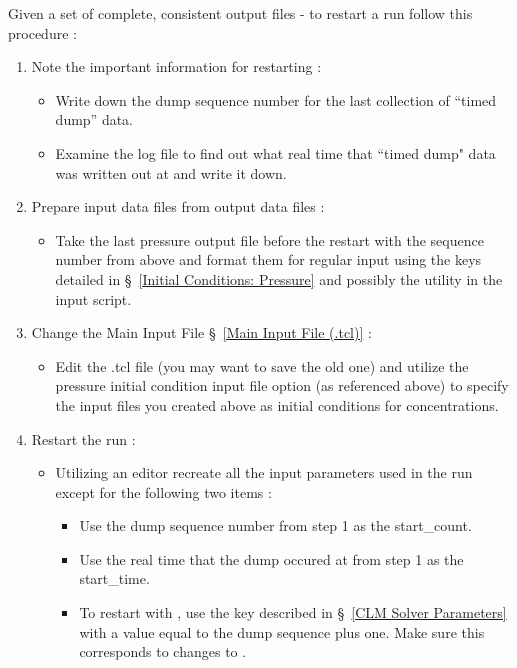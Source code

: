 Given a set of complete, consistent output files - to restart a run follow
this procedure :

\begin{enumerate}
   \item Note the important information for restarting :
   \begin{itemize}
      \item Write down the dump sequence number for the last collection of
           ``timed dump'' data.
      \item Examine the log file to find out what real time that ``timed dump"
            data was written out at and write it down.
   \end{itemize}
   \item Prepare input data files from output data files :
   \begin{itemize}
      \item Take the last pressure output file before the restart with the sequence number
            from above and format them for regular input using the keys detailed in \S~\ref{Initial Conditions: Pressure} and possibly the  utility in the input script.
   \end{itemize}
   \item Change the Main Input File \S~\ref{Main Input File (.tcl)} :
   \begin{itemize}
      \item Edit the .tcl file (you may want to save the old one) and
            utilize the pressure initial condition input file option (as referenced above) to specify
             the input files you created above as initial conditions
            for concentrations.
   \end{itemize}
   \item Restart the run :
   \begin{itemize}
      \item Utilizing an editor recreate all the input parameters used
            in the run except for the following two items :
            \begin{itemize}
               \item Use the dump sequence number from step 1
                     as the start\_count.
               \item Use the real time that the dump occured at from step 1
                     as the start\_time.
	     \item To restart with , use the  key described in \S~\ref{CLM Solver Parameters} with a value equal to the dump sequence plus one. Make sure this corresponds to changes to . 
            \end{itemize}
   \end{itemize}
\end{enumerate}

